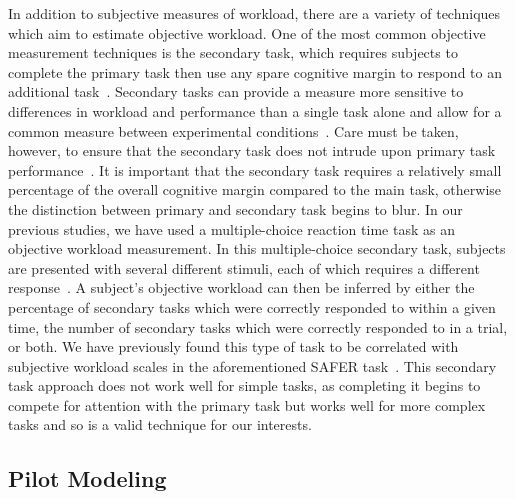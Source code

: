 In addition to subjective measures of workload, there are a variety of techniques which aim to estimate objective workload.
One of the most common objective measurement techniques is the secondary task, which requires subjects to complete the primary task then use any spare cognitive margin to respond to an additional task~\citep{gawron_human_2008}.
Secondary tasks can provide a measure more sensitive to differences in workload and performance than a single task alone and allow for a common measure between experimental conditions~\citep{slocum1971meaningful}.
Care must be taken, however, to ensure that the secondary task does not intrude upon primary task performance~\citep{williges_behavioral_1979}.
It is important that the secondary task requires a relatively small percentage of the overall cognitive margin compared to the main task, otherwise the distinction between primary and secondary task begins to blur.
In our previous studies, we have used a multiple-choice reaction time task as an objective workload measurement.
In this multiple-choice secondary task, subjects are presented with several different stimuli, each of which requires a different response~\citep{lysaght_operator_1989}.
A subject's objective workload can then be inferred by either the percentage of secondary tasks which were correctly responded to within a given time, the number of secondary tasks which were correctly responded to in a trial, or both.
We have previously found this type of task to be correlated with subjective workload scales in the aforementioned SAFER task~\citep{karasinski_real-time_2017}.
This secondary task approach does not work well for simple tasks, as completing it begins to compete for attention with the primary task but works well for more complex tasks and so is a valid technique for our interests.

\subsection{Pilot Modeling}
\label{background:pilotmodeling}

